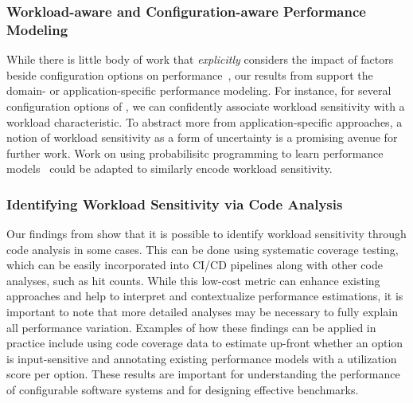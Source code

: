 {{{\subsubsection{Workload-aware and Configuration-aware Performance Modeling} While there is little body of work that \textit{explicitly} considers the impact of factors beside configuration options on performance~\cite{koc_satune_2021}, our results from  support the domain- or application-specific performance modeling. For instance, for several configuration options of \jumper, we can confidently associate workload sensitivity with a workload characteristic. To abstract more from application-specific approaches, a notion of workload sensitivity as a form of uncertainty is a promising avenue for further work. Work on using probabilisitc programming to learn performance models~\cite{dorn2020} could be adapted to similarly encode workload sensitivity.

{\color{brown}
\subsubsection{Identifying Workload Sensitivity via Code Analysis}
Our findings from  show that it is possible to identify workload sensitivity through code analysis in some cases. This can be done using systematic coverage testing, which can be easily incorporated into CI/CD pipelines along with other code analyses, such as hit counts. While this low-cost metric can enhance existing approaches and help to interpret and contextualize performance estimations, it is important to note that more detailed analyses may be necessary to fully explain all performance variation.
Examples of how these findings can be applied in practice include using code coverage data to estimate up-front whether an option is input-sensitive and annotating existing performance models with a utilization score per option. These results are important for understanding the performance of configurable software systems and for designing effective benchmarks.

}

}}}

